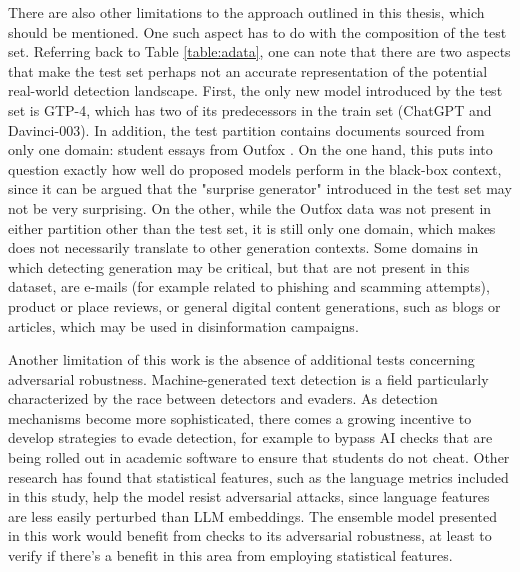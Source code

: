 There are also other limitations to the approach outlined in this thesis, which should be mentioned.
One such aspect has to do with the composition of the test set.
Referring back to Table \ref{table:adata}, one can note that there are two aspects that make the test set perhaps not an accurate representation of the potential real-world detection landscape.
First, the only new model introduced by the test set is GTP-4, which has two of its predecessors in the train set (ChatGPT and Davinci-003).
In addition, the test partition contains documents sourced from only one domain: student essays from Outfox \citep{koike2024outfox}.
On the one hand, this puts into question exactly how well do proposed models perform in the black-box context, since it can be argued that the "surprise generator" introduced in the test set may not be very surprising.
On the other, while the Outfox data was not present in either partition other than the test set, it is still only one domain, which makes does not necessarily translate to other generation contexts.
Some domains in which detecting generation may be critical, but that are not present in this dataset, are e-mails (for example related to phishing and scamming attempts), product or place reviews, or general digital content generations, such as blogs or articles, which may be used in disinformation campaigns.

Another limitation of this work is the absence of additional tests concerning adversarial robustness.
Machine-generated text detection is a field particularly characterized by the race between detectors and evaders.
As detection mechanisms become more sophisticated, there comes a growing incentive to develop strategies to evade detection, for example to bypass AI checks that are being rolled out in academic software to ensure that students do not cheat.
Other research \citep{Crothers_2022} has found that statistical features, such as the language metrics included in this study, help the model resist adversarial attacks, since language features are less easily perturbed than LLM embeddings.
The ensemble model presented in this work would benefit from checks to its adversarial robustness, at least to verify if there's a benefit in this area from employing statistical features.

